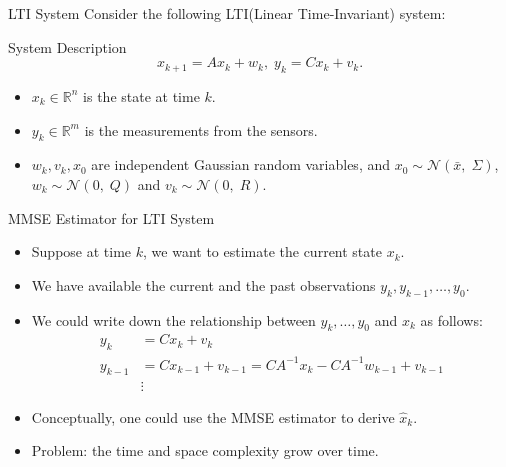 \documentclass{beamer}
\begin{document}
\begin{frame}{LTI System}
  Consider the following LTI(Linear Time-Invariant) system:
  \begin{block}{System Description}
      \begin{displaymath}
	x_{k+1} = Ax_k +  w_k,\; y_{k} = C x_k + v_k.
      \end{displaymath}
    \end{block}
    \begin{itemize}
      \item $x_k \in \mathbb R^n$ is the state at time $k$.
      \item  $y_k \in \mathbb R^m$ is the measurements from the sensors. 
      \item $w_k,v_k,x_0$ are independent Gaussian random variables, and $x_0 \sim \mathcal N(\bar x,\;\Sigma)$, $w_k \sim \mathcal N(0,\;Q)$ and $v_k \sim \mathcal N(0,\;R)$. 
    \end{itemize}
  \end{frame}

  \begin{frame}{MMSE Estimator for LTI System}
    \begin{itemize}
      \item Suppose at time $k$, we want to estimate the current state $x_k$.
      \item We have available the current and the past observations $y_k,y_{k-1},\dots,y_0$.
      \item We could write down the relationship between $y_k,\dots,y_0$ and $x_k$ as follows:
	\begin{displaymath}
	  \begin{split}
	    y_k& = C x_k + v_k \\
	    y_{k-1} & = Cx_{k-1}+v_{k-1} = CA^{-1}x_k -C A^{-1}w_{k-1} + v_{k-1}\\
	    &\vdots
	  \end{split}
	\end{displaymath}
      \item Conceptually, one could use the MMSE estimator to derive $\hat x_k$.
      \item Problem: the time and space complexity grow over time.
    \end{itemize}
  \end{frame}
\end{document}

